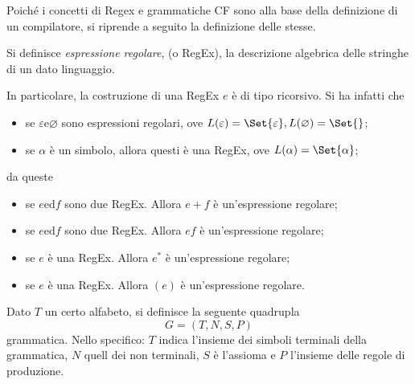 \documentclass{subfiles}
\begin{document}
Poiché i concetti di Regex e grammatiche CF sono alla base della definizione di un compilatore,
si riprende a seguito la definizione delle stesse.
\begin{Definition*}
    Si definisce \emph{espressione regolare}, (o RegEx), la descrizione algebrica delle stringhe di un dato linguaggio.
\end{Definition*}
\noindent In particolare, la costruzione di una RegEx \(e\) è di tipo ricorsivo. Si ha infatti che
\begin{itemize}
    \item se \(\varepsilon \text{e} \varnothing\) sono espressioni regolari, ove \(L(\varepsilon) = \Set{\varepsilon}, L(\varnothing) = \Set{}\);
    \item se \(\alpha\) è un simbolo, allora questi è una RegEx, ove \(L(\alpha) = \Set{\alpha}\);
\end{itemize}
da queste
\begin{itemize}
    \item se \(e \text{ed} f\) sono due RegEx. Allora \(e + f\) è un'espressione regolare;
    \item se \(e \text{ed} f\) sono due RegEx. Allora \(ef\) è un'espressione regolare;
    \item se \(e\) è una RegEx. Allora \(e^{*}\) è un'espressione regolare;
    \item se \(e\) è una RegEx. Allora \((e)\) è un'espressione regolare.
\end{itemize}

\begin{Definition*}
    Dato \(T\) un certo alfabeto, si definisce la seguente quadrupla
    \[
        G = (T, N, S, P)
    \]
    grammatica. Nello specifico: \(T\) indica l'insieme dei simboli terminali della grammatica, \(N\) quell dei non terminali,
    \(S\) è l'assioma e \(P\) l'insieme delle regole di produzione.
\end{Definition*}
\end{document}
